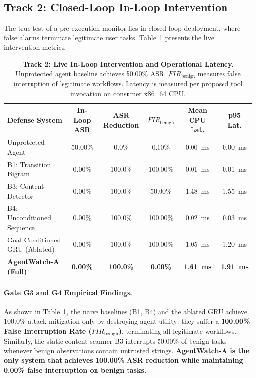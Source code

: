 \documentclass[11pt,a4paper]{article}
\begin{document}
\subsection{Track 2: Closed-Loop In-Loop Intervention}

The true test of a pre-execution monitor lies in closed-loop deployment, where false alarms terminate legitimate user tasks. Table~\ref{tab:track2} presents the live intervention metrics.

\begin{table}[h!]
\centering
\small
\caption{\textbf{Track 2: Live In-Loop Intervention and Operational Latency.} Unprotected agent baseline achieves 50.00\% ASR. $FIR_{\text{benign}}$ measures false interruption of legitimate workflows. Latency is measured per proposed tool invocation on consumer x86\_64 CPU.}
\label{tab:track2}
\begin{tabular}{lccccc}
\toprule
\textbf{Defense System} & \textbf{In-Loop ASR} & \textbf{ASR Reduction} & \textbf{$FIR_{\text{benign}}$} & \textbf{Mean CPU Lat.} & \textbf{p95 Lat.} \\
\midrule
Unprotected Agent             & 50.00\% & 0.0\%   & 0.00\%   & 0.00~ms & 0.00~ms \\
B1: Transition Bigram         & 0.00\%  & 100.0\% & 100.00\% & 0.01~ms & 0.01~ms \\
B3: Content Detector          & 0.00\%  & 100.0\% & 50.00\%  & 1.48~ms & 1.55~ms \\
B4: Unconditioned Sequence    & 0.00\%  & 100.0\% & 100.00\% & 0.02~ms & 0.03~ms \\
Goal-Conditioned GRU (Ablated)& 0.00\%  & 100.0\% & 100.00\% & 1.05~ms & 1.20~ms \\
\midrule
\textbf{AgentWatch-A (Full)}  & \textbf{0.00\%} & \textbf{100.0\%} & \textbf{0.00\%} & \textbf{1.61~ms} & \textbf{1.91~ms} \\
\bottomrule
\end{tabular}
\end{table}

\paragraph{Gate G3 and G4 Empirical Findings.}
As shown in Table~\ref{tab:track2}, the naive baselines (B1, B4) and the ablated GRU achieve 100.0\% attack mitigation only by destroying agent utility: they suffer a \textbf{100.00\% False Interruption Rate ($FIR_{\text{benign}}$)}, terminating all legitimate workflows. Similarly, the static content scanner B3 interrupts 50.00\% of benign tasks whenever benign observations contain untrusted strings. 
\textbf{AgentWatch-A is the only system that achieves 100.00\% ASR reduction while maintaining 0.00\% false interruption on benign tasks.}
\end{document}
